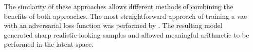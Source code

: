 The similarity of these approaches allows different methods of combining the benefits of both approaches. The most straightforward approach of training a \acrshort{vae} with an adversarial loss function was performed by \textcite{LarsenSW15autoencodingbeyond}. The resulting model generated sharp realistic-looking samples and allowed meaningful arithmetic to be performed in the latent space.


% 
% 
% 


